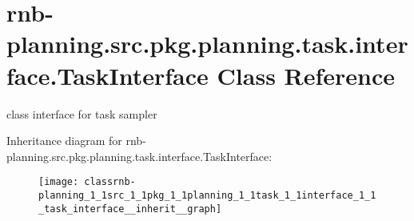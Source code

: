 \hypertarget{classrnb-planning_1_1src_1_1pkg_1_1planning_1_1task_1_1interface_1_1_task_interface}{}\section{rnb-\/planning.src.\+pkg.\+planning.\+task.\+interface.\+Task\+Interface Class Reference}
\label{classrnb-planning_1_1src_1_1pkg_1_1planning_1_1task_1_1interface_1_1_task_interface}


class interface for task sampler  




Inheritance diagram for rnb-\/planning.src.\+pkg.\+planning.\+task.\+interface.\+Task\+Interface\+:\nopagebreak
\begin{figure}[H]
\begin{center}
\leavevmode
\texttt{[image: classrnb-planning\_1\_1src\_1\_1pkg\_1\_1planning\_1\_1task\_1\_1interface\_1\_1\_task\_interface\_\_inherit\_\_graph]}
\end{center}
\end{figure}
